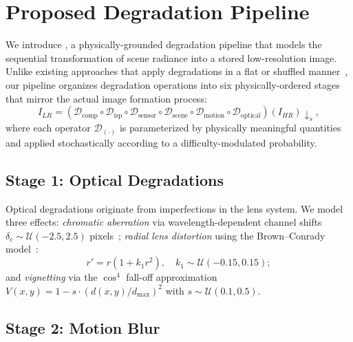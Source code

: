 \section{Proposed Degradation Pipeline}
\label{sec:pipeline}

We introduce \pipeline, a physically-grounded degradation pipeline that models the sequential transformation of scene radiance into a stored low-resolution image.
Unlike existing approaches that apply degradations in a flat or shuffled manner~\cite{zhang2021designing,wang2021real}, our pipeline organizes degradation operations into six physically-ordered stages that mirror the actual image formation process:
\begin{equation}
    I_{LR} = \left( \mathcal{D}_{\text{comp}} \circ \mathcal{D}_{\text{isp}} \circ \mathcal{D}_{\text{sensor}} \circ \mathcal{D}_{\text{scene}} \circ \mathcal{D}_{\text{motion}} \circ \mathcal{D}_{\text{optical}} \right)(I_{HR}) \downarrow_{s},
    \label{eq:full_pipeline}
\end{equation}
where each operator $\mathcal{D}_{(\cdot)}$ is parameterized by physically meaningful quantities and applied stochastically according to a difficulty-modulated probability.

\subsection{Stage 1: Optical Degradations}
\label{sec:pipeline_optical}

Optical degradations originate from imperfections in the lens system.
We model three effects: \textit{chromatic aberration} via wavelength-dependent channel shifts $\delta_c \sim \mathcal{U}(-2.5, 2.5)$ pixels~\cite{kang2007automatic};
\textit{radial lens distortion} using the Brown--Conrady model~\cite{brown1971close}:
\begin{equation}
    r' = r \left(1 + k_1 r^2 \right), \quad k_1 \sim \mathcal{U}(-0.15, 0.15);
    \label{eq:radial_distortion}
\end{equation}
and \textit{vignetting} via the $\cos^4$ fall-off approximation $V(x,y) = 1 - s \cdot (d(x,y)/d_{\max})^2$ with $s \sim \mathcal{U}(0.1, 0.5)$.

\subsection{Stage 2: Motion Blur}
\label{sec:pipeline_motion}

